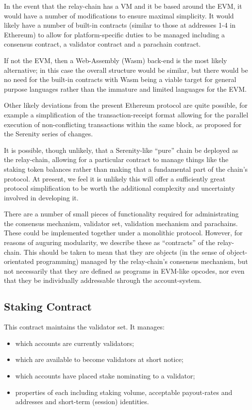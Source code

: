 \documentclass[9pt,oneside]{amsart}
\providecommand{\tightlist}{%
  \setlength{\itemsep}{0pt}\setlength{\parskip}{0pt}}
\begin{document}
\begin{multicols}{2}
 In the event that the relay-chain has a VM and it be based around the EVM, it would have a number of modifications to ensure maximal simplicity. It would likely have a number of built-in contracts (similar to those at addresses 1-4 in Ethereum) to allow for platform-specific duties to be managed including a consensus contract, a validator contract and a parachain contract.

 If not the EVM, then a Web-Assembly (Wasm) back-end is the most likely alternative; in this case the overall structure would be similar, but there would be no need for the built-in contracts with Wasm being a viable target for general purpose languages rather than the immature and limited languages for the EVM.

 Other likely deviations from the present Ethereum protocol are quite possible, for example a simplification of the transaction-receipt format allowing for the parallel execution of non-conflicting transactions within the same block, as proposed for the Serenity series of changes.

 It is possible, though unlikely, that a Serenity-like ``pure'' chain be deployed as the relay-chain, allowing for a particular contract to manage things like the staking token balances rather than making that a fundamental part of the chain's protocol. At present, we feel it is unlikely this will offer a sufficiently great protocol simplification to be worth the additional complexity and uncertainty involved in developing it.

 There are a number of small pieces of functionality required for administrating the consensus mechanism, validator set, validation mechanism and parachains. These could be implemented together under a monolithic protocol. However, for reasons of auguring modularity, we describe these as ``contracts'' of the relay-chain. This should be taken to mean that they are objects (in the sense of object-orientated programming) managed by the relay-chain's consensus mechanism, but not necessarily that they are defined as programs in EVM-like opcodes, nor even that they be individually addressable through the account-system.

\subsection{Staking Contract}
\label{staking-contract}

 This contract maintains the validator set. It manages:

\begin{itemize}
\tightlist
\item which accounts are currently validators;
\item which are available to become validators at short notice;
\item which accounts have placed stake nominating to a validator;
\item properties of each including staking volume, acceptable payout-rates and addresses and short-term (session) identities.
\end{itemize}


\end{multicols}
\end{document}
